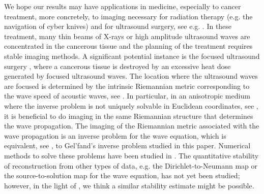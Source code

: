 \documentclass[11pt,letterpaper]{amsart}
\numberwithin{equation}{section}
\theoremstyle{definition}
\theoremstyle{plain}
\theoremstyle{definition}
\theoremstyle{plain}
\theoremstyle{definition}
\theoremstyle{plain}
\begin{document}
We hope our results may have applications in medicine, especially to cancer treatment, more concretely, to imaging necessary for radiation therapy
(e.g. the navigation of cyber knives) and for ultrasound surgery, see e.g. \cite{W}. In these treatment, many thin beams of X-rays or high amplitude ultrasound waves are concentrated in the cancerous tissue and the planning of the treatment requires stable imaging methods. 
A significant potential instance is the focused ultrasound surgery \cite{Tempany}, where a cancerous tissue is destroyed by an excessive
  heat dose generated by focused ultrasound waves. The location where the ultrasound waves are focused
  is determined by the intrinsic Riemannian metric corresponding to the wave speed of acoustic waves, see \cite{Dahl,L}.
   In particular, in an anisotropic medium where the inverse problem is not uniquely solvable in Euclidean coordinates, see \cite{Sylvester}, it is beneficial 
  to do imaging in the same Riemannian structure that determines the wave propagation. 
 The  imaging of the Riemannian metric associated with the wave propagation is an 
  inverse problem for the wave equation, which is equivalent, see  \cite{KKLM}, to
  Gel'fand's inverse problem studied in this paper. 
Numerical methods to solve these problems
have been studied in \cite{HoopOksanen1,HoopOksanen2}.
The quantitative stability of reconstruction from other types of data, e.g. the Dirichlet-to-Neumann map or the source-to-solution map for the wave equation, has not yet been studied; however, in the light of \cite{BKL3,KKLM}, we think a similar stability estimate might be possible.
\end{document}
